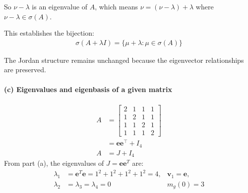 So $\nu - \lambda$ is an eigenvalue of $A$, which means $\nu = (\nu - \lambda) + \lambda$ where $\nu - \lambda \in \sigma(A)$.

This establishes the bijection:
\begin{align*}
    \sigma\left(A+ \lambda I\right) = \{\mu + \lambda : \mu \in \sigma(A)\}
\end{align*}

The Jordan structure remains unchanged because the eigenvector relationships are preserved.

\paragraph{(c) Eigenvalues and eigenbasis of a given matrix}
\begin{align*}
    A & = \begin{bmatrix}
              2 & 1 & 1 & 1 \\
              1 & 2 & 1 & 1 \\
              1 & 1 & 2 & 1 \\
              1 & 1 & 1 & 2
          \end{bmatrix}                  \\
      & = \mathbf{e}\mathbf{e}^\top + I_4 \\
    A & = J + I_4
\end{align*}
From part (a), the eigenvalues of $J = \mathbf{e}\mathbf{e}^T$ are:
\begin{align*}
    \lambda_1 & = \mathbf{e}^T\mathbf{e} = 1^2 + 1^2 + 1^2 + 1^2 = 4, & \mathbf{\mathbf{v}}_1 = \mathbf{e}, \\
    \lambda_2 & = \lambda_3 = \lambda_4 = 0                           & m_g(0) = 3
\end{align*}

